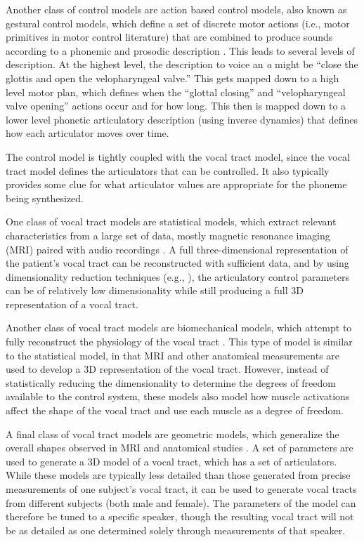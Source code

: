 \documentclass{article}
\begin{document}
Another class of control models are
action based control models,
also known as gestural control models,
which define a set of discrete motor actions
(i.e., motor primitives in motor control literature)
that are combined to produce sounds according
to a phonemic and prosodic description
\citep{birkholz2006}.
This leads to several levels of description.
At the highest level,
the description to voice an \textit{a}
might be
``close the glottis
and open the velopharyngeal valve.''
This gets mapped down to a
high level motor plan,
which defines when the ``glottal closing''
and ``velopharyngeal valve opening''
actions occur and for how long.
This then is mapped down
to a lower level phonetic articulatory description
(using inverse dynamics)
that defines how each articulator
moves over time.

The control model is tightly coupled
with the vocal tract model,
since the vocal tract model defines
the articulators that can be controlled.
It also typically provides some clue
for what articulator values
are appropriate for the
phoneme being synthesized.

One class of vocal tract models
are statistical models,
which extract relevant characteristics
from a large set of data,
mostly magnetic resonance imaging (MRI)
paired with audio recordings
\citep{XXX}.
A full three-dimensional representation
of the patient's vocal tract
can be reconstructed with sufficient data,
and by using dimensionality reduction techniques
(e.g., \citealp{badin2002}),
the articulatory control parameters
can be of relatively low dimensionality
while still producing a full
3D representation of a vocal tract.

Another class of vocal tract models
are biomechanical models,
which attempt to fully reconstruct
the physiology of the vocal tract
\citep{XXX}.
This type of model is similar
to the statistical model,
in that MRI and other anatomical measurements
are used to develop a 3D representation
of the vocal tract.
However, instead of statistically
reducing the dimensionality
to determine the degrees of freedom
available to the control system,
these models also model how
muscle activations affect the shape
of the vocal tract
and use each muscle
as a degree of freedom.

A final class of vocal tract models
are geometric models,
which generalize the overall
shapes observed in
MRI and anatomical studies
\citep{XXX}.
A set of parameters
are used to generate a 3D model
of a vocal tract,
which has a set of articulators.
While these models are typically
less detailed than those
generated from precise
measurements of one subject's vocal tract,
it can be used to generate vocal tracts
from different subjects
(both male and female).
The parameters of the model
can therefore be tuned to a specific speaker,
though the resulting vocal tract
will not be as detailed
as one determined solely through
measurements of that speaker.
\end{document}
